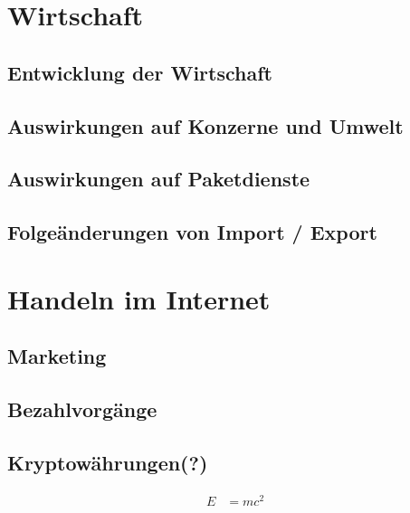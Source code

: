 \documentclass[a4paper, 10pt]{scrartcl}
\begin{document}
    \section{Wirtschaft}
        \subsection{Entwicklung der Wirtschaft}
        \subsection{Auswirkungen auf Konzerne und Umwelt}
        \subsection{Auswirkungen auf Paketdienste}
        \subsection{Folgeänderungen von Import / Export}
    \newpage
        
    \section{Handeln im Internet}
        \subsection{Marketing}
        \subsection{Bezahlvorgänge}
        \subsection{Kryptowährungen(?)}
    \newpage

    \begin{align} E &= mc^2 \end{align}
\end{document}

